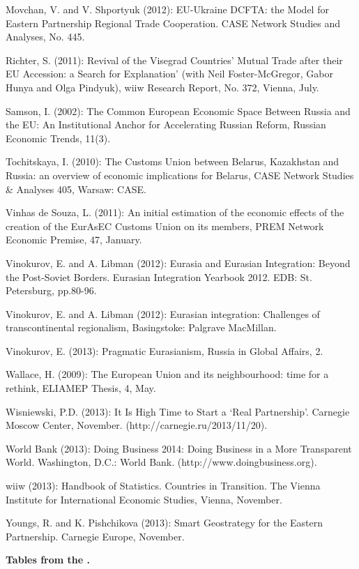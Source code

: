 Movchan, V. and V. Shportyuk (2012): EU-Ukraine DCFTA: the Model for Eastern Partnership Regional Trade Cooperation. CASE Network Studies and Analyses, No. 445.

Richter, S. (2011): Revival of the Visegrad Countries' Mutual Trade after their EU Accession: a Search for Explanation' (with Neil Foster-McGregor, Gabor Hunya and Olga Pindyuk), wiiw Research Report, No. 372, Vienna, July.

Samson, I. (2002): The Common European Economic Space Between Russia and the EU: An Institutional Anchor for Accelerating Russian Reform, Russian Economic Trends, 11(3).

Tochitskaya, I. (2010): The Customs Union between Belarus, Kazakhstan and Russia: an overview of economic implications for Belarus, CASE Network Studies \& Analyses 405, Warsaw: CASE.

Vinhas de Souza, L. (2011): An initial estimation of the economic effects of the creation of the EurAsEC Customs Union on its members, PREM Network Economic Premise, 47, January.

Vinokurov, E. and A. Libman (2012): Eurasia and Eurasian Integration: Beyond the Post-Soviet Borders. Eurasian Integration Yearbook 2012. EDB: St. Petersburg, pp.80-96.

Vinokurov, E. and A. Libman (2012): Eurasian integration: Challenges of transcontinental regionalism, Basingstoke: Palgrave MacMillan. 

Vinokurov, E. (2013): Pragmatic Eurasianism, Russia in Global Affairs, 2.

Wallace, H. (2009): The European Union and its neighbourhood: time for a rethink, ELIAMEP Thesis, 4, May.

Wisniewski, P.D. (2013): It Is High Time to Start a `Real Partnership'. Carnegie Moscow Center, November. (http://carnegie.ru/2013/11/20).

World Bank (2013): Doing Business 2014: Doing Business in a More Transparent World. Washington, D.C.: World Bank. (http://www.doingbusiness.org).

wiiw (2013): Handbook of Statistics. Countries in Transition. The Vienna Institute for International Economic Studies, Vienna, November.

Youngs, R. and K. Pishchikova (2013): Smart Geostrategy for the Eastern Partnership. Carnegie Europe, November.

\clearpage\newpage


{\bf Tables from the .}
\vspace*{2mm}

